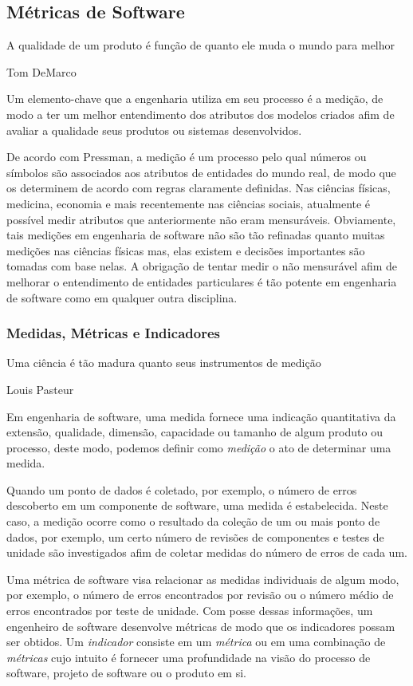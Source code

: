 \documentclass[11pt, a4paper]{article}
\begin{document}
\subsection{Métricas de Software}
\epigraph{A qualidade de um produto é função de quanto ele muda o mundo para melhor}{Tom DeMarco\cite[p.350]{pressman}}

Um elemento-chave que a engenharia utiliza em seu processo é a medição, de modo a ter um melhor entendimento dos atributos dos modelos criados afim de avaliar a qualidade seus produtos ou sistemas desenvolvidos.

De acordo com Pressman, a medição é um processo pelo qual números ou símbolos são associados aos atributos de entidades do mundo real, de modo que os determinem de acordo com regras claramente definidas. Nas ciências físicas, medicina, economia e mais recentemente nas ciências sociais, atualmente é possível medir atributos que anteriormente não eram mensuráveis. Obviamente, tais medições em engenharia de software não são tão refinadas quanto muitas medições nas ciências físicas mas, elas existem e decisões importantes são tomadas com base nelas. A obrigação de tentar medir o não mensurável afim de melhorar o entendimento de entidades particulares é tão potente em engenharia de software como em qualquer outra disciplina.\cite[p.348]{pressman}

\subsubsection{Medidas, Métricas e Indicadores}
\epigraph{Uma ciência é tão madura quanto seus instrumentos de medição}{Louis Pasteur\cite[p.352]{pressman}}

Em engenharia de software, uma medida fornece uma indicação quantitativa da extensão, qualidade, dimensão, capacidade ou tamanho de algum produto ou processo, deste modo, podemos definir como \textit{medição} o ato de determinar uma medida.\cite[p.348]{pressman}

Quando um ponto de dados é coletado, por exemplo, o número de erros descoberto em um componente de software, uma medida é estabelecida. Neste caso, a medição ocorre como o resultado da coleção de um ou mais ponto de dados, por exemplo, um certo número de revisões de componentes e testes de unidade são investigados afim de coletar medidas do número de erros de cada um.

Uma métrica de software visa relacionar as medidas individuais de algum modo, por exemplo, o número de erros encontrados por revisão ou o número médio de erros encontrados por teste de unidade. Com posse dessas informações, um engenheiro de software desenvolve métricas de modo que os indicadores possam ser obtidos. Um \textit{indicador} consiste em um \textit{métrica} ou em uma combinação de \textit{métricas} cujo intuito é fornecer uma profundidade na visão do processo de software, projeto de software ou o produto em si.\cite{pressman}
\end{document}
